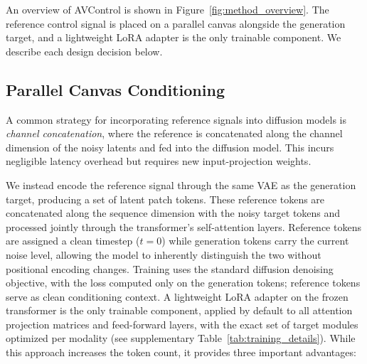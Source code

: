 

An overview of AVControl is shown in Figure~\ref{fig:method_overview}. The reference control signal is placed on a parallel canvas alongside the generation target, and a lightweight LoRA adapter is the only trainable component. We describe each design decision below.

\subsection{Parallel Canvas Conditioning}
A common strategy for incorporating reference signals into diffusion models is \emph{channel concatenation}, where the reference is concatenated along the channel dimension of the noisy latents and fed into the diffusion model. This incurs negligible latency overhead but requires new input-projection weights.

We instead encode the reference signal through the same VAE as the generation target, producing a set of latent patch tokens. These reference tokens are concatenated along the sequence dimension with the noisy target tokens and processed jointly through the transformer's self-attention layers. Reference tokens are assigned a clean timestep ($t{=}0$) while generation tokens carry the current noise level, allowing the model to inherently distinguish the two without positional encoding changes. Training uses the standard diffusion denoising objective, with the loss computed only on the generation tokens; reference tokens serve as clean conditioning context. A lightweight LoRA adapter on the frozen transformer is the only trainable component, applied by default to all attention projection matrices and feed-forward layers, with the exact set of target modules optimized per modality (see supplementary Table~\ref{tab:training_details}). While this approach increases the token count, it provides three important advantages:


